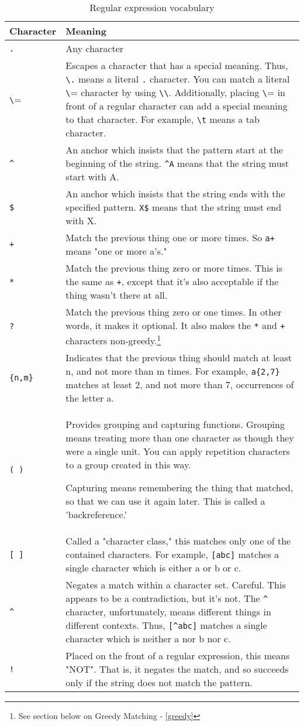 \begin{table}[ht]
\caption{Regular expression vocabulary}
\label{regex_vocab_table}
\begin{tabular}{l | p{12cm}}
Character &  Meaning\\ \hline \hline
\verb=.= &  Any character\\ \hline
\verb=\= & Escapes a character that has a special meaning. Thus, \verb=\.=
means a literal \verb=.= character. You can match a literal \verb=\=
character by using \verb=\\=. Additionally, placing \verb=\= 
in front of a regular 
character can add a special meaning to that character. For example,
\verb=\t= means a tab character.\\ \hline
\verb=^= & An anchor which insists that the pattern start at the beginning of the 
string. \verb=^A= means that the string must start with A.\\ \hline
\verb=$= & An anchor which insists that the string ends with the specified 
pattern. \verb=X$= means that the string must end with X.\\ \hline
\verb=+= &
Match the previous thing one or more times. So \verb=a+= means "one or 
more a's."\\ \hline
\verb=*= &
Match the previous thing zero or more times. This is the same as \verb=+=, 
except that it's also acceptable if the thing wasn't there at all.\\
\hline
\verb=?= &
Match the previous thing zero or one times. In other words, it makes it 
optional. It also makes the \verb=*= and \verb=+= characters non-greedy.\footnote{See section below on Greedy Matching - \ref{greedy}}\\ \hline
\verb={n,m}= &
Indicates that the previous thing should match at least n, and not more
than m times. For example, \verb=a{2,7}= matches at least 2, and not
more than 7, occurrences of the letter a. \\ \hline
\verb=( )= & 
Provides grouping and capturing functions. Grouping means treating 
more than one character as though they were a single unit. You can apply
repetition characters to a group created in this way.

Capturing means remembering the thing that matched, so that we can use it 
again later. This is called a 'backreference.'
\\ \hline
\verb=[ ]= &
Called a "character class," this matches only one of the contained 
characters. For example, \verb=[abc]= matches a single character which is 
either a or b or c.\\ \hline
\verb=^= &
Negates a match within a character set. Careful. This appears to be a 
contradiction, but it's not. The \verb=^= character, unfortunately, means 
different things in different contexts. Thus, \verb=[^abc]= matches a single 
character which is neither a nor b nor c.\\ \hline
\verb=!= &
Placed on the front of a regular expression, this means "NOT". That 
is, it negates the match, and so succeeds only if the string does not 
match the pattern.\\ \hline
\end{tabular}
\end{table}

